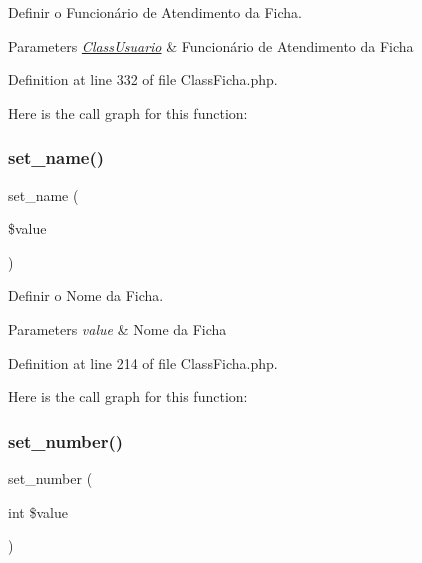Definir o Funcionário de Atendimento da Ficha. 


\begin{DoxyParams}{Parameters}
{\em \hyperlink{class_class_usuario}{Class\+Usuario}} & Funcionário de Atendimento da Ficha \\
\hline
\end{DoxyParams}


Definition at line 332 of file Class\+Ficha.\+php.

Here is the call graph for this function\+:
\mbox{\label{class_class_ficha_a53e29da8f1da63502f3e13091fcb74e5}} 
\subsubsection{\texorpdfstring{set\+\_\+name()}{set\_name()}}
{\footnotesize\ttfamily set\+\_\+name (\begin{DoxyParamCaption}\item[{}]{\$value }\end{DoxyParamCaption})}



Definir o Nome da Ficha. 


\begin{DoxyParams}{Parameters}
{\em value} & Nome da Ficha \\
\hline
\end{DoxyParams}


Definition at line 214 of file Class\+Ficha.\+php.

Here is the call graph for this function\+:
\mbox{\label{class_class_ficha_a2d73b58ab74d3f4449797ce66855ba12}} 
\subsubsection{\texorpdfstring{set\+\_\+number()}{set\_number()}}
{\footnotesize\ttfamily set\+\_\+number (\begin{DoxyParamCaption}\item[{int}]{\$value }\end{DoxyParamCaption})}



